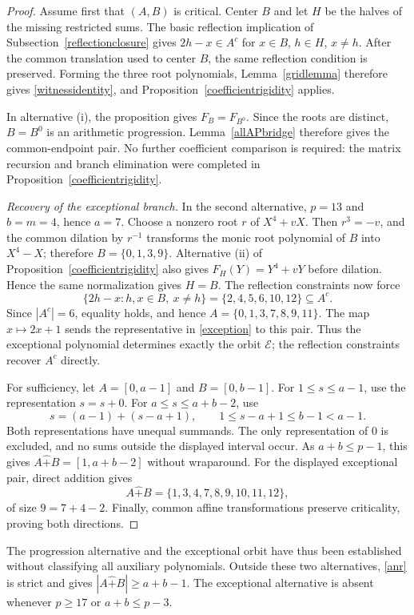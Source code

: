 \documentclass[10pt,a4paper]{amsart}
\newcommand{\rs}{\mathbin{\widehat+}}
\begin{document}
\begin{proof}
Assume first that $(A,B)$ is critical.  Center $B$ and let $H$ be the
halves of the missing restricted sums.  The basic reflection implication
of Subsection~\ref{reflectionclosure} gives
$2h-x\in A^c$ for $x\in B$, $h\in H$, $x\ne h$.  After the common
translation used to center $B$, the same reflection condition is
preserved.  Forming the three root polynomials, Lemma~\ref{gridlemma}
therefore gives \eqref{witnessidentity}, and
Proposition~\ref{coefficientrigidity} applies.

In alternative \textup{(i)}, the proposition gives $F_B=F_{B^0}$.
Since the roots are distinct, $B=B^0$ is an arithmetic progression.
Lemma~\ref{allAPbridge} therefore gives the common-endpoint pair.
No further coefficient comparison is required: the matrix recursion
and branch elimination were completed in
Proposition~\ref{coefficientrigidity}.

\emph{Recovery of the exceptional branch.}
In the second alternative, $p=13$ and $b=m=4$, hence $a=7$.  Choose a
nonzero root $r$ of $X^4+vX$.  Then $r^3=-v$, and the common dilation
by $r^{-1}$ transforms the monic root polynomial of $B$ into $X^4-X$;
therefore $B=\{0,1,3,9\}$.  Alternative \textup{(ii)} of Proposition~\ref{coefficientrigidity}
also gives $F_H(Y)=Y^4+vY$ before dilation.  Hence the same normalization
gives $H=B$.
The reflection constraints now force
\[
 \{2h-x:h,x\in B,\ x\ne h\}
       =\{2,4,5,6,10,12\}\subseteq A^c.
\]
Since $|A^c|=6$, equality holds, and hence
$A=\{0,1,3,7,8,9,11\}$.  The map $x\mapsto2x+1$ sends the representative in \eqref{exception}
to this pair.  Thus the exceptional polynomial determines exactly the orbit
$\mathcal E$; the reflection constraints recover $A^c$ directly.

For sufficiency, let $A=[0,a-1]$ and $B=[0,b-1]$.
For $1\le s\le a-1$, use the representation $s=s+0$.
For $a\le s\le a+b-2$, use
\[
 s=(a-1)+(s-a+1),\qquad 1\le s-a+1\le b-1<a-1.
\]
Both representations have unequal summands.  The only representation of $0$ is excluded,
and no sums outside the displayed interval occur.  As $a+b\le p-1$, this gives
$A\rs B=[1,a+b-2]$ without wraparound.  For the displayed exceptional
pair, direct addition gives
\[
 A\rs B=\{1,3,4,7,8,9,10,11,12\},
\]
of size $9=7+4-2$.  Finally, common affine transformations preserve
criticality, proving both directions.
\end{proof}

The progression alternative and the exceptional orbit have thus been
established without classifying all auxiliary polynomials.  Outside
these two alternatives, \eqref{anr} is strict and gives
$|A\rs B|\ge a+b-1$.  The exceptional alternative is absent whenever
$p\ge17$ or $a+b\le p-3$.
\end{document}
